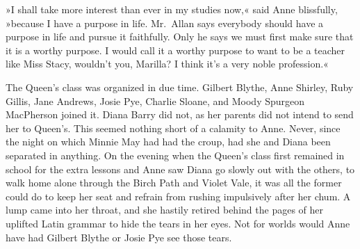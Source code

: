 »I shall take more interest than ever in my studies now,« said Anne blissfully, »because I have a purpose in life. Mr.~Allan says everybody should have a purpose in life and pursue it faithfully. Only he says we must first make sure that it is a worthy purpose. I would call it a worthy purpose to want to be a teacher like Miss Stacy, wouldn't you, Marilla? I think it's a very noble profession.«

The Queen's class was organized in due time. Gilbert Blythe, Anne Shirley, Ruby Gillis, Jane Andrews, Josie Pye, Charlie Sloane, and Moody Spurgeon MacPherson joined it. Diana Barry did not, as her parents did not intend to send her to Queen's. This seemed nothing short of a calamity to Anne. Never, since the night on which Minnie May had had the croup, had she and Diana been separated in anything. On the evening when the Queen's class first remained in school for the extra lessons and Anne saw Diana go slowly out with the others, to walk home alone through the Birch Path and Violet Vale, it was all the former could do to keep her seat and refrain from rushing impulsively after her chum. A lump came into her throat, and she hastily retired behind the pages of her uplifted Latin grammar to hide the tears in her eyes. Not for worlds would Anne have had Gilbert Blythe or Josie Pye see those tears.

